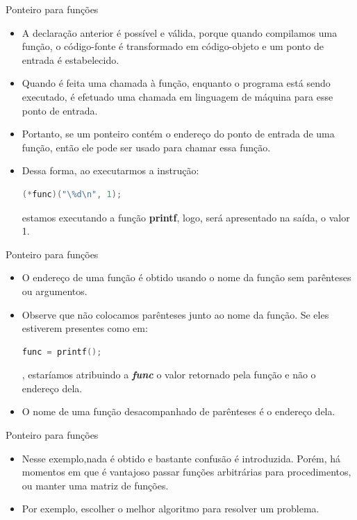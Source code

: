 \begin{frame}[fragile,c]{Ponteiro para funções}
\begin{itemize}[<+->]
  \item A declaração anterior é possível e válida, porque quando compilamos uma função, o código-fonte é transformado em código-objeto e um ponto de entrada é estabelecido. 
  \item Quando é feita uma chamada à função, enquanto o programa está sendo executado, é efetuado uma chamada em linguagem de máquina para esse ponto de entrada.
  \item Portanto, se um ponteiro contém o endereço do ponto de entrada de uma função, então ele pode ser usado para chamar essa função.
  \item Dessa forma, ao executarmos a instrução:
\begin{lstlisting}[language=C]
(*func)("\%d\n", 1);
\end{lstlisting} estamos executando a função \textbf{printf}, logo, será apresentado na saída, o valor 1.
\end{itemize}
\end{frame}

\begin{frame}[fragile,c]{Ponteiro para funções}
\begin{itemize}[<+->]
  \item O endereço de uma função é obtido usando o nome da função sem parênteses ou argumentos. 
  \item Observe que não colocamos parênteses junto ao nome da função. Se eles estiverem presentes como em:  
\begin{lstlisting}[language=C]
func = printf();
\end{lstlisting}, estaríamos atribuindo a \textit{\textbf{func}} o valor retornado pela função e não o endereço dela.
  \item \alert{O nome de uma função desacompanhado de parênteses é o endereço dela.}  
\end{itemize}
\end{frame}


\begin{frame}[fragile,c]{Ponteiro para funções}  
  \begin{itemize}[<+->]
    \item Nesse exemplo,nada é obtido e bastante confusão é introduzida. Porém, há momentos em que é vantajoso passar funções arbitrárias para procedimentos, ou manter uma matriz de funções.
    \item Por exemplo, escolher o melhor algoritmo para resolver um problema.
  \end{itemize}
\end{frame}

